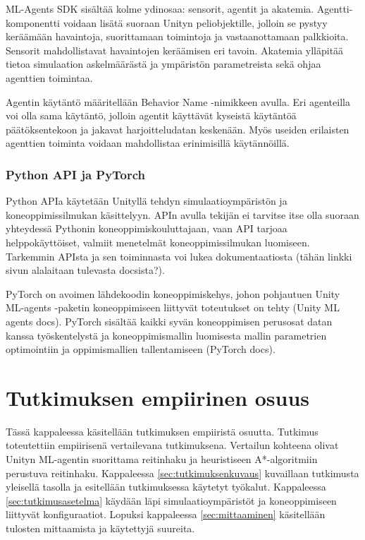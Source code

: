 \documentclass[utf8]{gradu3}
\begin{document}
ML-Agents SDK sisältää kolme ydinosaa: sensorit, agentit ja akatemia. Agentti-komponentti voidaan lisätä suoraan Unityn peliobjektille, jolloin se pystyy keräämään havaintoja, suorittamaan toimintoja ja vastaanottamaan palkkioita. Sensorit mahdollistavat havaintojen keräämisen eri tavoin. Akatemia ylläpitää tietoa simulaation askelmäärästä ja ympäristön parametreista sekä ohjaa agenttien toimintaa.

Agentin käytäntö määritellään Behavior Name -nimikkeen avulla. Eri agenteilla voi olla sama käytäntö, jolloin agentit käyttävät kyseistä käytäntöä päätöksentekoon ja jakavat harjoitteludatan keskenään. Myös useiden erilaisten agenttien toiminta voidaan mahdollistaa erinimisillä käytännöillä.

\subsection{Python API ja PyTorch}

Python APIa käytetään Unityllä tehdyn simulaatioympäristön ja koneoppimissilmukan käsittelyyn. APIn avulla tekijän ei tarvitse itse olla suoraan yhteydessä Pythonin koneoppimiskouluttajaan, vaan API tarjoaa helppokäyttöiset, valmiit menetelmät koneoppimissilmukan luomiseen. Tarkemmin APIsta ja sen toiminnasta voi lukea dokumentaatiosta (tähän linkki sivun alalaitaan tulevasta docsista?).

PyTorch on avoimen lähdekoodin koneoppimiskehys, johon pohjautuen Unity ML-agents -paketin koneoppimiseen liittyvät toteutukset on tehty (Unity ML agents docs). PyTorch sisältää kaikki syvän koneoppimisen perusosat datan kanssa työskentelystä ja koneoppimismallin luomisesta mallin parametrien optimointiin ja oppimismallien tallentamiseen (PyTorch docs).

\chapter{Tutkimuksen empiirinen osuus}

Tässä kappaleessa käsitellään tutkimuksen empiiristä osuutta. Tutkimus toteutettiin empiirisenä vertailevana tutkimuksena. Vertailun kohteena olivat Unityn ML-agentin suorittama reitinhaku ja heuristiseen A*-algoritmiin perustuva reitinhaku. Kappaleessa \ref{sec:tutkimuksenkuvaus} kuvaillaan tutkimusta yleisellä tasolla ja esitellään tutkimuksessa käytetyt työkalut. Kappaleessa \ref{sec:tutkimusasetelma} käydään läpi simulaatioympäristöt ja koneoppimiseen liittyvät konfiguraatiot. Lopuksi kappaleessa \ref{sec:mittaaminen} käsitellään tulosten mittaamista ja käytettyjä suureita.
\end{document}
